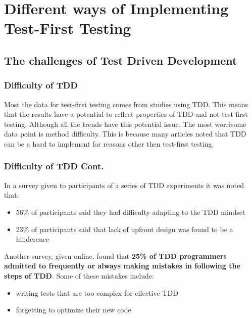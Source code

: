 \documentclass{beamer}
\newcommand{\linespace}{\vskip 0.25cm}
\begin{document}
\section[Different Implementations of Test-First]{Different ways of Implementing Test-First Testing} 

\subsection{The challenges of Test Driven Development}

\begin{frame}
\frametitle{Difficulty of TDD}
Most the data for test-first testing comes from studies using TDD.  This means that the results have a potential to reflect properties of TDD and not test-first testing.
\linespace
\linespace
Although all the trends have this potential issue.  The most worrisome data point is method difficulty.  This is because many articles noted that TDD can be a hard to implement for reasons other then test-first testing.
\end{frame}

\begin{frame}
\frametitle{Difficulty of TDD Cont.}
In a survey given to participants of a series of TDD experiments it was noted that:
\begin{itemize}
\item 56\% of participants said they had difficulty adapting to the TDD mindset
\item 23\% of participants said that lack of upfront design was found to be a hinderence
\end{itemize}
\linespace
\linespace

Another survey, given online, found that \textbf{25\% of TDD programmers admitted to frequently or always making mistakes in following the steps of TDD}.  Some of these mistakes include:
\begin{itemize}
\item writing tests that are too complex for effective TDD
\item forgetting to optimize their new code
\end{itemize}
\end{frame}
\end{document}

